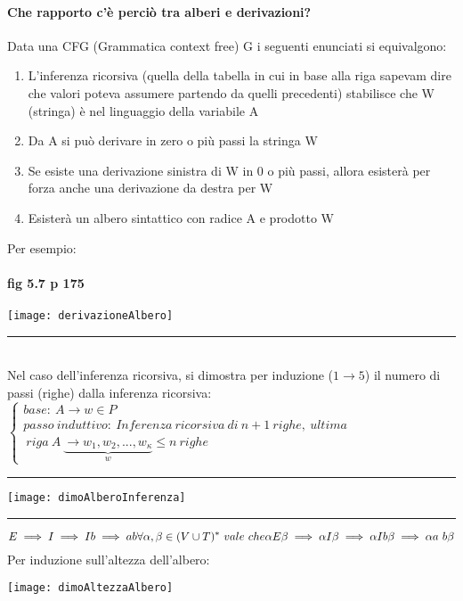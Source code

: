 \documentclass[12pt, a4paper, openany, oneside]{book}
\begin{document}
\paragraph{Che rapporto c'è perciò tra alberi e derivazioni?}  
Data una CFG (Grammatica context free) G i seguenti enunciati si equivalgono:
\begin{enumerate}
	\item L'inferenza ricorsiva (quella della tabella in cui in base alla riga
	sapevam dire che valori poteva assumere partendo da quelli precedenti) 
	stabilisce che W (stringa) è nel linguaggio della variabile A
	\item Da A si può derivare in zero o più passi la stringa W
	\item Se esiste una derivazione sinistra di W in 0 o più passi, allora
	esisterà per forza anche una derivazione da destra per W
	\item Esisterà un albero sintattico con radice A e prodotto W
\end{enumerate}
Per esempio: 
\paragraph{fig 5.7 p 175}
\begin{center}
\texttt{[image: derivazioneAlbero]}
\end{center}
{\color{black} \rule{\linewidth}{0.3mm} }
\\
Nel caso dell'inferenza ricorsiva, si dimostra per induzione ($1 \to 5$) il numero
di passi (righe) dalla inferenza ricorsiva: 
$\begin{cases}
base: ~ A \to w \in P \\
passo~induttivo: ~ Inferenza ~ ricorsiva ~  di ~  n+1  ~ righe, ~  ultima \\ 
~ riga ~  A ~ \underbrace{\to w_{1}, w_{2}, ..., w_{\kappa}}_{w} \leq n ~righe
\end{cases}$
\\
{\color{black} \rule{\linewidth}{0.3mm} }
\begin{center}
\texttt{[image: dimoAlberoInferenza]}
\end{center}
{\color{black} \rule{\linewidth}{0.3mm} }
\[E \implies I \implies Ib \implies ab \\
\forall \alpha, \beta \in (V \cup T)^{*} ~vale~ che \\
\alpha E \beta \implies \alpha I \beta \implies \alpha I b \beta \implies
\alpha a ~ b \beta\]
Per induzione sull'altezza dell'albero: 
\begin{center}
\texttt{[image: dimoAltezzaAlbero]}
\end{center}
\end{document}
